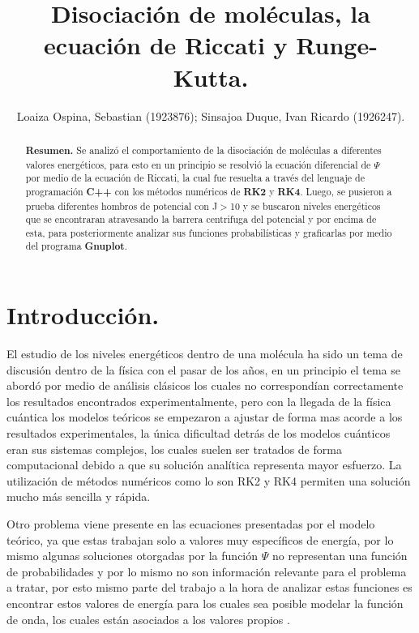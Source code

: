 \documentclass[twocolumn,preprintnumbers,amsmath,amssymb,aps,prl]{revtex4}
\begin{document}
\begin{abstract}
\textbf{Resumen.}
Se analizó el comportamiento de la disociación de moléculas a diferentes valores energéticos, para esto en un principio se resolvió la ecuación diferencial de $\Psi$ por medio de la ecuación de Riccati, la cual fue resuelta a través del lenguaje de programación \textbf{C++} con los métodos numéricos de \textbf{RK2} y \textbf{RK4}. Luego, se pusieron a prueba diferentes hombros de potencial con J$>$10 y se buscaron niveles energéticos que se encontraran atravesando la barrera centrifuga del potencial y por encima de esta, para posteriormente analizar sus funciones probabilísticas y graficarlas por medio del programa \textbf{Gnuplot}. 

\end{abstract}

\title{Disociación de moléculas, la ecuación de Riccati y Runge-Kutta.}
\author{Loaiza Ospina, Sebastian (1923876); Sinsajoa Duque, Ivan Ricardo (1926247).}

\maketitle

\section{Introducción.}
El estudio de los niveles energéticos dentro de una molécula ha sido un tema de discusión dentro de la física con el pasar de los años, en un principio el tema se abordó por medio de análisis clásicos los cuales no correspondían correctamente los resultados encontrados experimentalmente, pero con la llegada de la física cuántica los modelos teóricos se empezaron a ajustar de forma mas acorde a los resultados experimentales, la única dificultad detrás de los modelos cuánticos eran sus sistemas complejos, los cuales suelen ser tratados de forma computacional debido a que su solución analítica representa mayor esfuerzo. La utilización de métodos numéricos como lo son RK2 y RK4 permiten una solución mucho más sencilla y rápida.

Otro problema viene presente en las ecuaciones presentadas por el modelo teórico, ya que estas trabajan solo a valores muy específicos de energía, por lo mismo algunas soluciones otorgadas por la función $\Psi$ no representan una función de probabilidades y por lo mismo no son información relevante para el problema  a tratar, por esto mismo parte del trabajo a la hora de analizar estas funciones es encontrar estos valores de energía para los cuales sea posible modelar la función de onda, los cuales están asociados a los valores propios . 
\end{document}
